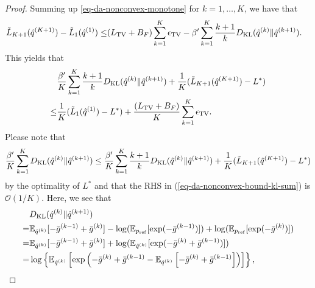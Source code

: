 \begin{proof}
Summing up \eqref{eq-da-nonconvex-monotone} for $k=1,\dots,K$, we have that 
\begin{align}
\tilde{L}_{K+1}(\hat{q}^{(K+1)}) - \tilde{L}_1(\hat{q}^{(1)}) \leq &   (L_{\mathrm{TV}} +B_F) \sum_{k=1}^K \epsilon_{\mathrm{TV}} 
- \beta'  \sum_{k=1}^{K}\frac{k+1}{k}D_{\mathrm{KL}}(\hat{q}^{(k)} \| \hat{q}^{(k+1)}). 
\end{align}
This yields that 
\begin{align}
&  
\frac{\beta'}{K} \sum_{k=1}^{K} %
\frac{k+1}{k}\KL(\qstark \| \qstarnext)   
+ 
\frac{1}{K}( \tilde{L}_{K+1}(\hat{q}^{(K+1)}) - L^*)\\
 \leq  &
\frac{1}{K} (\tilde{L}_1(\hat{q}^{(1)})- L^*) %
+ \frac{(\LipTV +B_F)}{K} \sum_{k=1}^K \epsilon_\TV. \label{eq-da-nonconvex-bound-kl-sum}
\end{align}
Please note that 
\begin{equation}
\frac{\beta'}{K} \sum_{k=1}^{K} %
\KL(\qstark \| \qstarnext)   
\leq
\frac{\beta'}{K} \sum_{k=1}^{K} %
\frac{k+1}{k}\KL(\qstark \| \qstarnext)  
+
\frac{1}{K}( \tilde{L}_{K+1}(\hat{q}^{(K+1)}) - L^*)
\end{equation}
by the optimality of $L^*$ and that the RHS in (\ref{eq-da-nonconvex-bound-kl-sum}) is $\mathcal{O}(1/K)$.
Here, we see that 
\begin{align}
&  \KL(\qstark \| \qstarnext)\\
= & 
\E_{\qstark}[ - \gbarkprev + \gbark ] -  \log(\E_{\pref}[\exp(-\gbarkprev)]) + \log(\E_{\pref}[\exp(-\gbark)])  \\
= & 
 \E_{\qstark}[ - \gbarkprev + \gbark ]  +  \log(\E_{\qstark}[\exp(-\gbark + \gbarkprev)]) \\  
=&  \log\left\{\E_{\qstark}\left[\exp\left(-\gbark + \gbarkprev - \E_{\qstark}\left[ - \gbark + \gbarkprev \right]\right)\right]\right\}, 

\end{align}
\end{proof}
